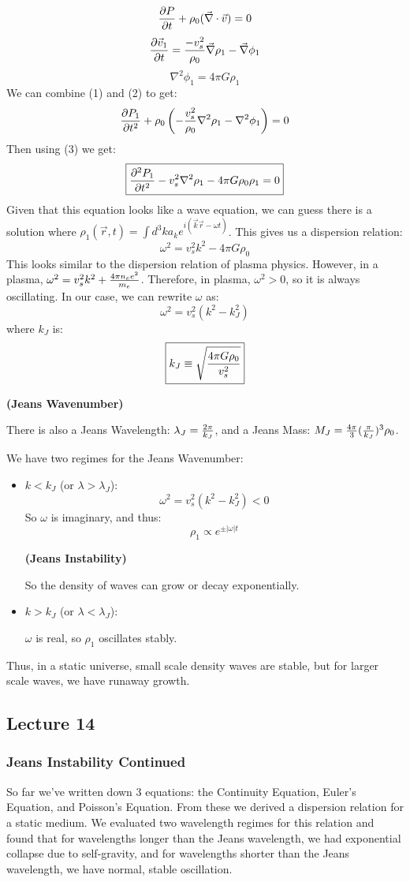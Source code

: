 \documentclass{article}
\def\vv{{\vec v}}
\def\vv{{\vec v}}
\begin{document}
$${\partial P\over \partial t}+\rho_0(\div\cdot\vv)=0$$
$${\partial\vv_1\over\partial t}={-v_s^2\over\rho_0}\div\rho_1
-\div\phi_1$$
$$\nabla^2\phi_1=4\pi G\rho_1$$
We can combine (1) and (2) to get:
$${\partial P_1\over\partial t^2}+\rho_0\left(-{v_s^2\over\rho_0}\nabla^2\rho_1
-\nabla^2\phi_1\right)=0$$
Then using (3) we get:
$$\boxed{{\partial^2P_1\over\partial t^2}-v_s^2\nabla^2\rho_1
-4\pi G\rho_0\rho_1=0}$$
Given that this equation looks like a wave equation, we can guess there
is a solution where 
$\rho_1(\vec r,t)=\int{d^3ka_ke^{i(\vec k\vec r-\omega t)}}$. This gives
us a dispersion relation:
$$\boxed{\omega^2=v_s^2k^2-4\pi G\rho_0}$$
This looks similar to the dispersion relation of plasma physics.  However,
in a plasma, $\omega^2=v_s^2k^2+{4\pi n_ee^2\over m_e}$.  Therefore,
in plasma, $\omega^2>0$, so it is always oscillating.  In our case, we can
rewrite $\omega$ as:
$$\omega^2=v_s^2(k^2-k_J^2)$$
where $k_J$ is:
$$\boxed{k_J\equiv\sqrt{4\pi G\rho_0\over v_s^2}}$$
\centerline{\bf (Jeans Wavenumber)}
There is also a Jeans Wavelength: $\lambda_J={2\pi\over k_J}$, and a
Jeans Mass: $M_J={4\pi\over3}({\pi\over k_J})^3\rho_0$.\par
We have two regimes for the Jeans Wavenumber:
\begin{itemize}
\item $k<k_J$ (or $\lambda>\lambda_J$):
$$\omega^2=v_s^2(k^2-k_J^2)<0$$
So $\omega$ is imaginary, and thus:
$$\rho_1\propto e^{\pm|\omega|t}$$
\centerline{\bf (Jeans Instability)}
So the density of waves can grow or decay exponentially.
\item $k>k_J$ (or $\lambda<\lambda_J$):\par
$\omega$ is real, so $\rho_1$ oscillates stably.
\end{itemize}
Thus, in a static universe, small scale density waves are stable, but for 
larger scale waves, we have runaway growth.

\subsection{Lecture 14}

\subsubsection*{ Jeans Instability Continued}

So far we've written down 3 equations: the Continuity Equation, Euler's 
Equation, and Poisson's Equation.
From these we derived a dispersion relation for a static medium.  We
evaluated two wavelength regimes for this relation and found that
for wavelengths longer than the Jeans wavelength, we had exponential
collapse due to self-gravity, and
for wavelengths shorter than the Jeans wavelength, we have normal,
stable oscillation.\par
\end{document}
